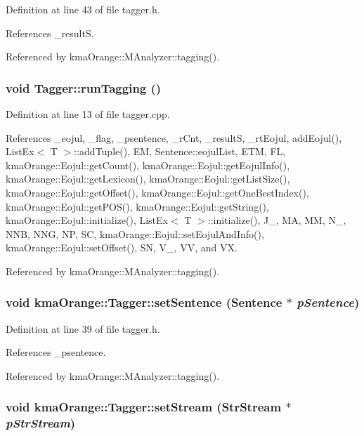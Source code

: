 Definition at line 43 of file tagger.h.

References \_\-resultS.

Referenced by kmaOrange::MAnalyzer::tagging().\hypertarget{classkmaOrange_1_1Tagger_a53c0e5e1bcd78600467b5010ced45a6}{
\subsubsection[{runTagging}]{\setlength{\rightskip}{0pt plus 5cm}void Tagger::runTagging ()}}
\label{classkmaOrange_1_1Tagger_a53c0e5e1bcd78600467b5010ced45a6}




Definition at line 13 of file tagger.cpp.

References \_\-eojul, \_\-flag, \_\-psentence, \_\-rCnt, \_\-resultS, \_\-rtEojul, addEojul(), ListEx$<$ T $>$::addTuple(), EM, Sentence::eojulList, ETM, FL, kmaOrange::Eojul::getCount(), kmaOrange::Eojul::getEojulInfo(), kmaOrange::Eojul::getLexicon(), kmaOrange::Eojul::getListSize(), kmaOrange::Eojul::getOffset(), kmaOrange::Eojul::getOneBestIndex(), kmaOrange::Eojul::getPOS(), kmaOrange::Eojul::getString(), kmaOrange::Eojul::initialize(), ListEx$<$ T $>$::initialize(), J\_\-, MA, MM, N\_\-, NNB, NNG, NP, SC, kmaOrange::Eojul::setEojulAndInfo(), kmaOrange::Eojul::setOffset(), SN, V\_\-, VV, and VX.

Referenced by kmaOrange::MAnalyzer::tagging().\hypertarget{classkmaOrange_1_1Tagger_4799c62076d6ca9c986c678cdadc4198}{
\subsubsection[{setSentence}]{\setlength{\rightskip}{0pt plus 5cm}void kmaOrange::Tagger::setSentence ({\bf Sentence} $\ast$ {\em pSentence})}}
\label{classkmaOrange_1_1Tagger_4799c62076d6ca9c986c678cdadc4198}




Definition at line 39 of file tagger.h.

References \_\-psentence.

Referenced by kmaOrange::MAnalyzer::tagging().\hypertarget{classkmaOrange_1_1Tagger_ce367128987513755a3581ed5ef3dfd4}{
\subsubsection[{setStream}]{\setlength{\rightskip}{0pt plus 5cm}void kmaOrange::Tagger::setStream ({\bf StrStream} $\ast$ {\em pStrStream})}}
\label{classkmaOrange_1_1Tagger_ce367128987513755a3581ed5ef3dfd4}




